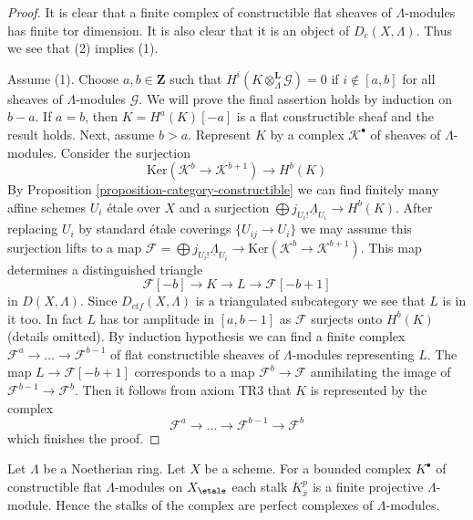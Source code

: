 \begin{proof}
It is clear that a finite complex of constructible
flat sheaves of $\Lambda$-modules has finite tor dimension.
It is also clear that it is an object of $D_c(X, \Lambda)$.
Thus we see that (2) implies (1).

\medskip\noindent
Assume (1). Choose $a, b \in \mathbf{Z}$ such that
$H^i(K \otimes_\Lambda^\mathbf{L} \mathcal{G}) = 0$ if
$i \not \in [a, b]$ for all sheaves of $\Lambda$-modules $\mathcal{G}$.
We will prove the final assertion holds by induction on $b - a$. If
$a = b$, then $K = H^a(K)[-a]$ is a flat constructible sheaf
and the result holds. Next, assume $b > a$. Represent $K$
by a complex $\mathcal{K}^\bullet$ of sheaves of $\Lambda$-modules.
Consider the surjection
$$
\text{Ker}(\mathcal{K}^b \to \mathcal{K}^{b + 1})
\longrightarrow
H^b(K)
$$
By Proposition \ref{proposition-category-constructible}
we can find finitely many affine schemes $U_i$ \'etale over $X$ and a
surjection $\bigoplus j_{U_i!}\underline{\Lambda}_{U_i} \to H^b(K)$.
After replacing $U_i$ by standard \'etale coverings $\{U_{ij} \to U_i\}$
we may assume this surjection lifts to a map
$\mathcal{F} = \bigoplus j_{U_i!}\underline{\Lambda}_{U_i} \to
\text{Ker}(\mathcal{K}^b \to \mathcal{K}^{b + 1})$.
This map determines a distinguished triangle
$$
\mathcal{F}[-b] \to K \to L \to \mathcal{F}[-b + 1]
$$
in $D(X, \Lambda)$. Since $D_{ctf}(X, \Lambda)$ is a triangulated
subcategory we see that $L$ is in it too. In fact $L$ has
tor amplitude in $[a, b - 1]$ as $\mathcal{F}$ surjects onto
$H^b(K)$ (details omitted). By induction hypothesis we can find
a finite complex $\mathcal{F}^a \to \ldots \to \mathcal{F}^{b - 1}$
of flat constructible sheaves of $\Lambda$-modules representing $L$.
The map $L \to \mathcal{F}[-b + 1]$ corresponds to a map
$\mathcal{F}^b \to \mathcal{F}$ annihilating the image
of $\mathcal{F}^{b - 1} \to \mathcal{F}^b$. Then it follows
from axiom TR3 that $K$ is represented by the complex
$$
\mathcal{F}^a \to \ldots \to \mathcal{F}^{b - 1} \to \mathcal{F}^b
$$
which finishes the proof.
\end{proof}

\begin{remark}
\label{remark-projective-each-degree}
Let $\Lambda$ be a Noetherian ring. Let $X$ be a scheme.
For a bounded complex $K^\bullet$ of constructible flat $\Lambda$-modules
on $X_\etale$
each stalk $K^p_{\overline{x}}$ is a finite projective $\Lambda$-module.
Hence the stalks of the complex are perfect complexes of $\Lambda$-modules.
\end{remark}

